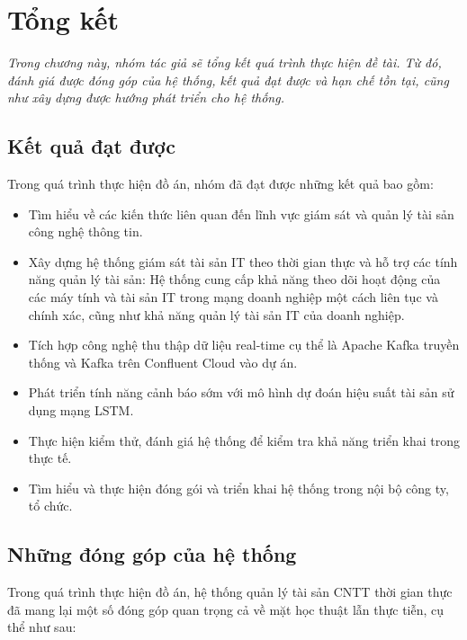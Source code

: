 \section{Tổng kết}
\noindent \textit{Trong chương này, nhóm tác giả sẽ tổng kết quá trình thực hiện đề tài. Từ đó, đánh giá được đóng góp của hệ thống, kết quả đạt được và hạn chế tồn tại, cũng như xây dựng được hướng phát triển cho hệ thống.}
\subsection{Kết quả đạt được}
\noindent Trong quá trình thực hiện đồ án, nhóm đã đạt được những kết quả bao gồm:
\begin{itemize}[label=--]
    \item Tìm hiểu về các kiến thức liên quan đến lĩnh vực giám sát và quản lý tài sản công nghệ thông tin.
    \item Xây dựng hệ thống giám sát tài sản IT theo thời gian thực và hỗ trợ các tính năng quản lý tài sản: Hệ thống cung cấp khả năng theo dõi hoạt động của các máy tính và tài sản IT trong mạng doanh nghiệp một cách liên tục và chính xác, cũng như khả năng quản lý tài sản IT của doanh nghiệp.
    \item Tích hợp công nghệ thu thập dữ liệu real-time cụ thể là Apache Kafka truyền thống và Kafka trên Confluent Cloud vào dự án.
    \item Phát triển tính năng cảnh báo sớm với mô hình dự đoán hiệu suất tài sản sử dụng mạng LSTM.
    \item Thực hiện kiểm thử, đánh giá hệ thống để kiểm tra khả năng triển khai trong thực tế.
    \item Tìm hiểu và thực hiện đóng gói và triển khai hệ thống trong nội bộ công ty, tổ chức.
\end{itemize}
\subsection{Những đóng góp của hệ thống}

\noindent Trong quá trình thực hiện đồ án, hệ thống quản lý tài sản CNTT thời gian thực đã mang lại một số đóng góp quan trọng cả về mặt học thuật lẫn thực tiễn, cụ thể như sau:

